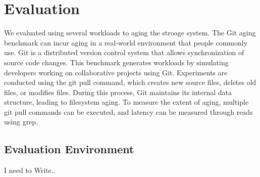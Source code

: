 \section{Evaluation}\label{s:eval}

We evaluated using several workloads to aging the stroage system.
The Git aging benchmark\cite{conway:login17,senescence:fast17} can incur aging in a real-world environment that people commonly use.
Git is a distributed version control system that allows synchronization of source code changes.
This benchmark generates workloads by simulating developers working on collaborative projects using Git.
Experiments are conducted using the git pull command, which creates new source files, deletes old files, or modifies files. During this process, Git maintains its internal data structure, leading to filesystem aging.
To measure the extent of aging, multiple git pull commands can be executed, and latency can be measured through reads using grep.






\subsection{Evaluation Environment}

I need to Write..

